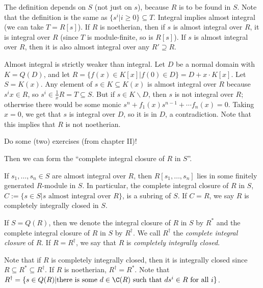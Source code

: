  \begin{remark}
   The definition depends on $S$ (not just on $s$), because $R$ is to be found in $S$.
   Note that the definition is the same as $\{s^i|i\ge 0\}\subseteq T$. Integral implies
   almost integral (we can take $T=R[s]$). If $R$ is noetherian, then if $s$ is almost
   integral over $R$, it is integral over $R$ (since $T$ is module-finite, so is $R[s]$).
   If $s$ is almost integral over $R$, then it is also almost integral over any
   $R'\supseteq R$.
 \end{remark}
 \begin{example}[$D+(x)$ construction] Almost integral is strictly weaker than integral.
  Let $D$ be a normal domain with $K=Q(D)$, and let $R=\{f(x)\in K[x]|f(0)\in D\} =
  D+x\cdot K[x]$. Let $S=K(x)$. Any element of $s\in K\subseteq K(x)$ is almost integral
  over $R$ because $s^i x\in R$, so $s^i\in \frac{1}{x}R = T\subseteq S$. But if $s\in
  K\smallsetminus D$, then $s$ is not integral over $R$; otherwise there would be some
  monic $s^n+f_1(x)s^{n-1}+\cdots f_n(x)=0$. Taking $x=0$, we get that $s$ is integral
  over $D$, so it is in $D$, a contradiction. Note that this implies that $R$ is not
  noetherian.
 \end{example}
 \setcounter{lecture}{27}

 Do some (two) exercises (from chapter II)!

 Then we can form the ``complete integral closure of $R$ in $S$''.
 \begin{proposition}
   If $s_1,\dots, s_n\in S$ are almost integral over $R$, then $R[s_1,\dots, s_n]$ lies
   in some finitely generated $R$-module in $S$. In particular, the complete integral
   closure of $R$ in $S$, $C:=\{s\in S| s\text{ almost integral over }R\}$, is a subring
   of $S$. If $C=R$, we say $R$ is completely integrally closed in $S$.
 \end{proposition}
 \begin{definition}
   If $S=Q(R)$, then we denote the integral closure of $R$ in $S$ by $R^*$ and the
   complete integral closure of $R$ in $S$ by $R^\dag$. We call $R^\dag$ the
   \emph{complete integral closure} of $R$. If $R=R^\dag$, we say that $R$ is
   \emph{completely integrally closed}.
 \end{definition}
 \begin{remark}
   Note that if $R$ is completely integrally closed, then it is integrally closed since
   $R\subseteq R^*\subseteq R^\dag$. If $R$ is noetherian, $R^\dag=R^*$. Note that
   $R^\dag=\{s\in Q(R)|\text{there is some }d\in \C(R) \text{ such that }ds^i\in R\text{
   for all }i\}$.
 \end{remark}

